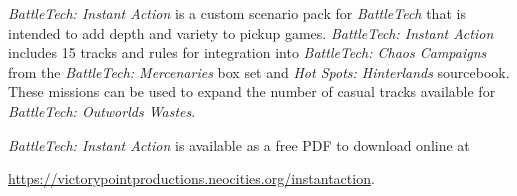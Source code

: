 \emph{BattleTech: Instant Action} is a custom scenario pack for \emph{BattleTech} that is intended to add depth and variety to pickup games.
\emph{BattleTech: Instant Action} includes 15 tracks and rules for integration into \emph{BattleTech: Chaos Campaigns} from the \emph{BattleTech: Mercenaries} box set and \emph{Hot Spots: Hinterlands} sourcebook.
These missions can be used to expand the number of casual tracks available for \emph{BattleTech: Outworlds Wastes}.

\emph{BattleTech: Instant Action} is available as a free PDF to download online at

 \href{https://victorypointproductions.neocities.org/instantaction}{https://victorypointproductions.neocities.org/instantaction}.
